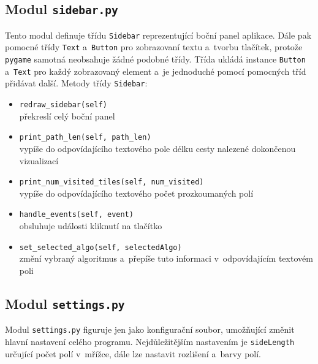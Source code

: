 \documentclass[12pt]{report}			%
\begin{document}
			\subsection{Modul \texttt{sidebar.py}}
			Tento modul definuje třídu \texttt{Sidebar} reprezentující boční panel aplikace. Dále pak pomocné třídy \texttt{Text} a~\texttt{Button} pro zobrazovaní textu a~tvorbu tlačítek, protože \texttt{pygame} samotná neobsahuje žádné podobné třídy. Třída ukládá instance \texttt{Button} a~\texttt{Text} pro každý zobrazovaný element a~je jednoduché pomocí pomocných tříd přidávat další.
			Metody třídy \texttt{Sidebar}:
			
			\begin{itemize}
			\setlength\itemsep{0.01mm}
			\item \texttt{redraw\_sidebar(self)}\\
			překreslí celý boční panel
			\item \texttt{print\_path\_len(self, path\_len)}\\
			vypíše do odpovídajícího textového pole délku cesty nalezené dokončenou vizualizací
			\item \texttt{print\_num\_visited\_tiles(self, num\_visited)}\\
			vypíše do odpovídajícího textového počet prozkoumaných polí
			\item \texttt{handle\_events(self, event)}\\
			obsluhuje události kliknutí na tlačítko
			\item \texttt{set\_selected\_algo(self, selectedAlgo)}\\
			změní vybraný algoritmus a~přepíše tuto informaci v~odpovídajícím textovém poli
			\end{itemize}
			
			
			
			\subsection{Modul \texttt{settings.py}}
			Modul \texttt{settings.py} figuruje jen jako konfigurační soubor, umožňující změnit hlavní nastavení celého programu. Nejdůležitějším nastavením je \texttt{sideLength} určující počet polí v~mřížce, dále lze nastavit rozlišení a~barvy polí.
			
\end{document}
